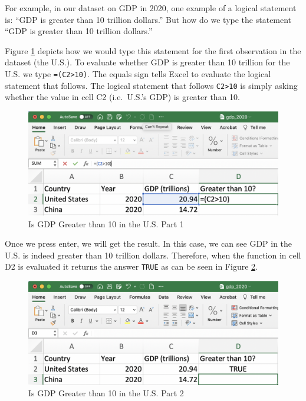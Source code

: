 \documentclass[
]{book}
\begin{document}
For example, in our dataset on GDP in 2020, one example of a logical statement is: ``GDP is greater than 10 trillion dollars.'' But how do we type the statement ``GDP is greater than 10 trillion dollars.''

Figure \ref{fig:tf1} depicts how we would type this statement for the first observation in the dataset (the U.S.). To evaluate whether GDP is greater than 10 trillion for the U.S. we type \texttt{=(C2\textgreater{}10)}. The equals sign tells Excel to evaluate the logical statement that follows. The logical statement that follows \texttt{C2\textgreater{}10} is simply asking whether the value in cell C2 (i.e.~U.S.'s GDP) is greater than 10.

\begin{figure}

{\centering \includegraphics[width=1\linewidth]{images/01_tf1} 

}

\caption{Is GDP Greater than 10 in the U.S. Part 1}\label{fig:tf1}
\end{figure}

Once we press enter, we will get the result. In this case, we can see GDP in the U.S. is indeed greater than 10 trillion dollars. Therefore, when the function in cell D2 is evaluated it returns the answer \texttt{TRUE} as can be seen in Figure \ref{fig:tf2}.

\begin{figure}

{\centering \includegraphics[width=1\linewidth]{images/01_tf2} 

}

\caption{Is GDP Greater than 10 in the U.S. Part 2}\label{fig:tf2}
\end{figure}
\end{document}
